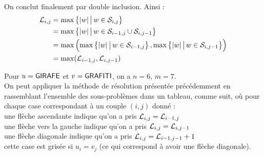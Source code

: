 \begin{Preuve}[la propriété]
On conclut finalement par double inclusion. Ainsi :
	\begin{align*}
		\cal{L}_{i,j} & = \max \left\{|w|\,\middle|\,w\in\cal{S}_{i,j}\right\} \\
		& = \max \left\{|w|\,\middle|\, w\in \cal{S}_{i-1,j} \cup \cal{S}_{i,j-1}\right\} \\
		& = \max \left( \max \left\{|w|\,\middle|\, w\in \cal{S}_{i-1,j}\right\}, \max \left\{|w|\,\middle|\, w\in \cal{S}_{i,j-1}\right\}\right) \\
		& = \max(\cal{L}_{i-1,j}, \cal{L}_{i,j-1})
	\end{align*}

		\end{Preuve}
		
		\colsep{5pt}
		\begin{Exemple}
			Pour \( u = \text{\sf{GIRAFE}} \) et \( v = \text{\sf{GRAFITI}} \), on a \( n = 6 \), \( m = 7 \). \\
			On peut appliquer la méthode de résolution présentée précédemment en rassemblant l'ensemble des sous-problèmes dans un tableau, comme suit, où pour chaque case correspondant à un couple \((i,j)\) donné : \\
				 \bdot une flèche ascendante indique qu'on a pris \(\cal{L}_{i,j} = \cal{L}_{i-1,j}\) \\
				 \bdot une flèche vers la gauche indique qu'on a pris \(\cal{L}_{i,j} = \cal{L}_{i,j-1}\) \\
				 \bdot une flèche diagonale indique qu'on a pris \(\cal{L}_{i,j} = \cal{L}_{i-1,j-1} + 1\) \\
				 \bdot cette case est grisée si \(u_i = v_j\) (ce qui correspond à avoir une flèche diagonale). \renewcommand{\arraystretch}{1}
		\begin{center}
		\begin{tabular}{|c|c||c|c|c|c|c|c|c|c|}

\end{tabular}
\end{center}
\end{Exemple}
